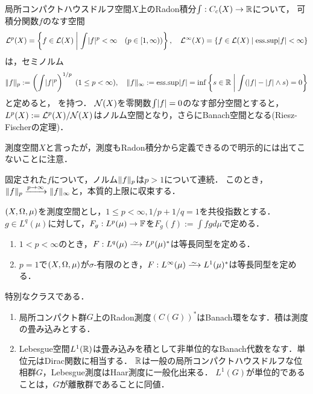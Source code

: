 \documentclass[uplatex,dvipdfmx]{jsreport}
\begin{document}
\begin{example}[測度空間上の体値関数の同値類]\label{exp-Banach-space-of-Radon-integrable-functions}
    局所コンパクトハウスドルフ空間$X$上のRadon積分$\int:C_c(X)\to\mathbb{R}$について，
    可積分関数$f$のなす空間
    \begin{align*}
        \mathcal{L}^p(X)=\left\{f\in\mathcal{L}(X)\;\middle|\;\int\lvert f\rvert^p<\infty\quad(p\in[1,\infty))\right\},\quad\mathcal{L}^\infty(X)=\left\{f\in\mathcal{L}(X)\;\middle|\;\mathrm{ess.sup}\lvert f\rvert<\infty\right\}
    \end{align*}
    は，セミノルム
    \[\|f\|_p:=\left(\int\lvert f\rvert^p\right)^{1/p}\;(1\le p<\infty),\quad\|f\|_\infty:=\mathrm{ess.sup}\lvert f\rvert=\inf\left\{s\in\mathbb{R}\;\middle|\;\int(\lvert f\rvert-\lvert f\rvert\land s)=0\right\}\]と定めると，
    を持つ．
    $\mathcal{N}(X)$を零関数$\int\lvert f\rvert=0$のなす部分空間とすると，$L^p(X):=\mathcal{L}^p(X)/\mathcal{N}(X)$はノルム空間となり，さらにBanach空間となる(Riesz-Fischerの定理)．

    測度空間$X$と言ったが，測度もRadon積分から定義できるので明示的には出てこないことに注意．
\end{example}
\begin{remark}
    固定された$f$について，ノルム$\|f\|_p$は$p>1$について連続．
    このとき，$\|f\|_p\xrightarrow{p\to\infty}\|f\|_\infty$と，本質的上限に収束する．
\end{remark}
    
\begin{theorem}[$L^p$空間の描像]\label{thm-Lp-of-dual-spaces}
    $(X,\Omega,\mu)$を測度空間とし，$1\le p<\infty,1/p+1/q=1$を共役指数とする．
    $g\in L^q(\mu)$に対して，$F_g:L^p(\mu)\to\mathbb{F}$を$F_g(f):=\int fgd\mu$で定める．
    \begin{enumerate}
        \item $1<p<\infty$のとき，$F:L^q(\mu)\iso L^p(\mu)^*$は等長同型を定める．
        \item $p=1$で$(X,\Omega,\mu)$が$\sigma$-有限のとき，$F:L^\infty(\mu)\iso L^1(\mu)^*$は等長同型を定める．
    \end{enumerate}
\end{theorem}

\begin{example}
    特別なクラスである．
    \begin{enumerate}
        \item 局所コンパクト群$G$上のRadon測度$(C(G))^*$はBanach環をなす．積は測度の畳み込みとする．
        \item Lebesgue空間$L^1(\mathbb{R})$は畳み込みを積として非単位的なBanach代数をなす．単位元はDirac関数に相当する．
        $\mathbb{R}$は一般の局所コンパクトハウスドルフな位相群$G$，Lebesgue測度はHaar測度に一般化出来る．
        $L^1(G)$が単位的であることは，$G$が離散群であることに同値．
    \end{enumerate}
\end{example}
\end{document}
